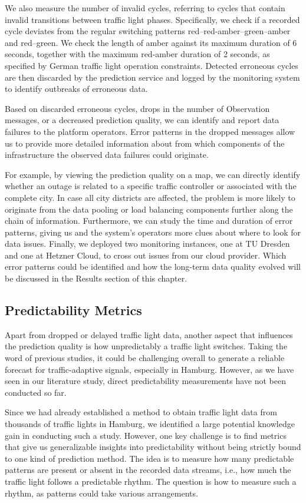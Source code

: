 We also measure the number of invalid cycles, referring to cycles that contain invalid transitions between traffic light phases. Specifically, we check if a recorded cycle deviates from the regular switching patterns red--red-amber--green--amber and red--green. We check the length of amber against its maximum duration of 6 seconds, together with the maximum red-amber duration of 2 seconds, as specified by German traffic light operation constraints. Detected erroneous cycles are then discarded by the prediction service and logged by the monitoring system to identify outbreaks of erroneous data.

Based on discarded erroneous cycles, drops in the number of Observation messages, or a decreased prediction quality, we can identify and report data failures to the platform operators. Error patterns in the dropped messages allow us to provide more detailed information about from which components of the infrastructure the observed data failures could originate. 

For example, by viewing the prediction quality on a map, we can directly identify whether an outage is related to a specific traffic controller or associated with the complete city. In case all city districts are affected, the problem is more likely to originate from the data pooling or load balancing components further along the chain of information. Furthermore, we can study the time and duration of error patterns, giving us and the system's operators more clues about where to look for data issues. Finally, we deployed two monitoring instances, one at TU Dresden and one at Hetzner Cloud, to cross out issues from our cloud provider. Which error patterns could be identified and how the long-term data quality evolved will be discussed in the Results section of this chapter.

\subsection{Predictability Metrics}

Apart from dropped or delayed traffic light data, another aspect that influences the prediction quality is how unpredictably a traffic light switches. Taking the word of previous studies, it could be challenging overall to generate a reliable forecast for traffic-adaptive signals, especially in Hamburg. However, as we have seen in our literature study, direct predictability measurements have not been conducted so far. 

Since we had already established a method to obtain traffic light data from thousands of traffic lights in Hamburg, we identified a large potential knowledge gain in conducting such a study. However, one key challenge is to find metrics that give us generalizable insights into predictability without being strictly bound to one kind of prediction method. The idea is to measure how many predictable patterns are present or absent in the recorded data streams, i.e., how much the traffic light follows a predictable rhythm. The question is how to measure such a rhythm, as patterns could take various arrangements.

